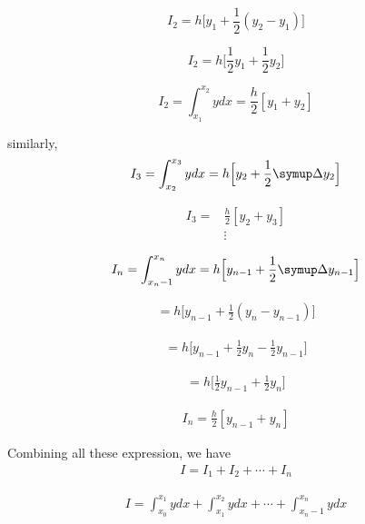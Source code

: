 \documentclass[a4paper,12pt]{report}
\numberwithin{equation}{section}
\begin{document}
\begin{equation*}
I_2=h\Big[y_1+\frac{1}{2}(y_2-y_1)\Big]
\end{equation*}

\begin{equation*}
I_2=h\Big[\frac{1}{2}y_1+\frac{1}{2}y_2\Big]
\end{equation*}

\begin{equation*}
I_2=\int_{x_1}^{x_2}ydx=\frac{h}{2}[y_1+y_2]
\end{equation*}

similarly,\\

\begin{equation*}
I_3=\int_{x_2}^{x_3}ydx=h\Big[y_2+\frac{1}{2}\symup\Delta{y_2}\Big]
\end{equation*}

\begin{align*}
I_3=&\frac{h}{2}[y_2+y_3]\\
 &\vdots\\
\end{align*}
\begin{align*}
I_n=\int_{x_n-1}^{x_n}ydx=h\Big[y_{n-1}+\frac{1}{2}\symup\Delta{y_{n-1}}\Big]
\end{align*}

\begin{align*}
=h\Big[y_{n-1}+\frac{1}{2}(y_n-y_{n-1})\Big]
\end{align*}

\begin{align*}
=h\Big[y_{n-1}+\frac{1}{2}y_n-\frac{1}{2}y_{n-1}\Big]
\end{align*}

\begin{align*}
=h\Big[\frac{1}{2}y_{n-1}+\frac{1}{2}y_n\Big]
\end{align*}

\begin{align*}
I_n=\frac{h}{2}[y_{n-1}+y_n]
\end{align*}

Combining all these expression, we have\\

\begin{align*}
I=I_1+I_2+\cdots+I_n
\end{align*}

\begin{align*}
I=\int_{x_0}^{x_1}ydx+\int_{x_1}^{x_2}ydx+\cdots+\int_{x_n-1}^{x_n}ydx
\end{align*}
\end{document}
